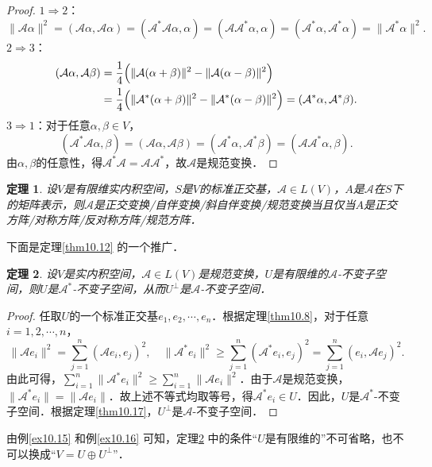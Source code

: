 \documentclass[a4paper,fontset=windows]{ctexbook}
\newtheorem{theorem}{定理}[chapter]
\theoremstyle{definition}
\def\note{\noindent\raisebox{10pt}{\dbend}\hspace{7pt}}
\renewcommand{\ge}{\geqslant}
\begin{document}
\begin{proof}
$1\Rightarrow 2$：
$$\|\mathcal{A}\alpha\|^2=(\mathcal{A}\alpha,\mathcal{A}\alpha)=(\mathcal{A^*A}\alpha,\alpha)=(\mathcal{AA^*}\alpha,\alpha)=(\mathcal{A}^*\alpha,\mathcal{A}^*\alpha)=\|\mathcal{A}^*\alpha\|^2.$$
$2\Rightarrow 3$：
\begin{align*}
(\mathcal{A}\alpha,\mathcal{A}\beta)&=\frac{1}{4}\Bigl(\|\mathcal{A}(\alpha+\beta)\|^2-\|\mathcal{A}(\alpha-\beta)\|^2\Bigr) \\
&=\frac{1}{4}\Bigl(\|\mathcal{A}^*(\alpha+\beta)\|^2-\|\mathcal{A}^*(\alpha-\beta)\|^2\Bigr)=(\mathcal{A}^*\alpha,\mathcal{A}^*\beta).
\end{align*}
$3\Rightarrow 1$：对于任意$\alpha,\beta\in V$，
$$(\mathcal{A^*A}\alpha,\beta)=(\mathcal{A}\alpha,\mathcal{A}\beta)=(\mathcal{A}^*\alpha,\mathcal{A}^*\beta)=(\mathcal{AA^*}\alpha,\beta).$$
由$\alpha,\beta$的任意性，得$\mathcal{A^*A}=\mathcal{AA^*}$，故$\mathcal{A}$是规范变换．
\end{proof}

\begin{theorem}\label{thm10.19}
设$V$是有限维实内积空间，$S$是$V$的标准正交基，$\mathcal{A}\in L(V)$，$A$是$\mathcal{A}$在$S$下的矩阵表示，则$\mathcal{A}$是正交变换/自伴变换/斜自伴变换/规范变换当且仅当$A$是正交方阵/对称方阵/反对称方阵/规范方阵．
\end{theorem}

下面是定理\ref{thm10.12} 的一个推广．

\begin{theorem}\label{thm10.20}
设$V$是实内积空间，$\mathcal{A}\in L(V)$是规范变换，$U$是有限维的$\mathcal{A}$-不变子空间，则$U$是$\mathcal{A}^*$-不变子空间，从而$U^\perp$是$\mathcal{A}$-不变子空间．
\end{theorem}

\begin{proof}
任取$U$的一个标准正交基$e_1,e_2,\cdots,e_n$．根据定理\ref{thm10.8}，对于任意$i=1,2,\cdots,n$，
$$\|\mathcal{A}e_i\|^2=\sum_{j=1}^n(\mathcal{A}e_i,e_j)^2,\quad\|\mathcal{A}^*e_i\|^2\ge\sum_{j=1}^n(\mathcal{A}^*e_i,e_j)^2=\sum_{j=1}^n(e_i,\mathcal{A}e_j)^2.$$
由此可得，$\sum\limits_{i=1}^n\|\mathcal{A}^*e_i\|^2\ge\sum\limits_{i=1}^n\|\mathcal{A}e_i\|^2$．由于$\mathcal{A}$是规范变换，$\|\mathcal{A}^*e_i\|=\|\mathcal{A}e_i\|$．故上述不等式均取等号，得$\mathcal{A}^*e_i\in U$．因此，$U$是$\mathcal{A}^*$-不变子空间．根据定理\ref{thm10.17}，$U^\perp$是$\mathcal{A}$-不变子空间．
\end{proof}

\note 由例\ref{ex10.15} 和例\ref{ex10.16} 可知，定理\ref{thm10.20} 中的条件“$U$是有限维的”不可省略，也不可以换成“$V=U\oplus U^\perp$”．
\end{document}
